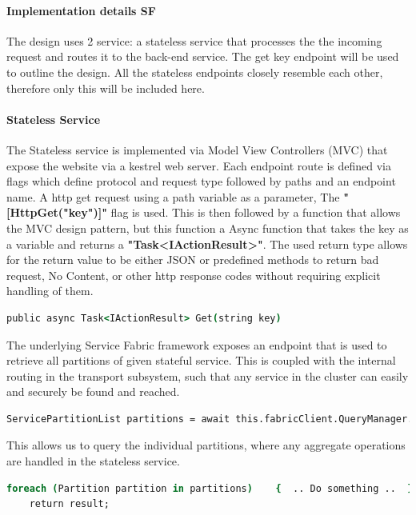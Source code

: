 \documentclass[a4paper,10pt,titlepage]{report}
\begin{document}
\paragraph*{Implementation details SF}

The design uses 2 service: a  stateless service that processes the the incoming request and routes it to the back-end service. The get key endpoint will be used to outline the design. All the stateless endpoints closely resemble each other, therefore only this will be included here.\\
        
\paragraph*{Stateless Service}
The Stateless service is implemented via Model View Controllers (MVC) that expose the website via a kestrel web server. Each endpoint route is defined via flags which define protocol and request type followed by paths and an endpoint name. A http get request using a path variable as a parameter, The \textbf{"[HttpGet("{key}")]"} flag is used. This is then followed by a function that allows the MVC design pattern, but this function a Async function that takes the key as a variable and returns a \textbf{"Task<IActionResult>"}. The used return type allows for the return value to be either JSON or predefined methods to return bad request, No Content, or other http response codes without requiring explicit handling of them.
\begin{lstlisting}[language=csh]
public async Task<IActionResult> Get(string key)
\end{lstlisting}   

The underlying Service Fabric framework exposes an endpoint that is used to retrieve all partitions of given stateful service. This is coupled with the internal routing in the transport subsystem, such that any service in the cluster can easily and securely be found and reached. 
\begin{lstlisting}[language=csh]
    ServicePartitionList partitions = await this.fabricClient.QueryManager.GetPartitionListAsync(serviceName);
\end{lstlisting}   
This allows us to query the individual partitions, where any aggregate operations are handled in the stateless service.
\begin{lstlisting}[language=csh]
    foreach (Partition partition in partitions)    {  .. Do something ..  }
    return result;
\end{lstlisting}  
\end{document}
